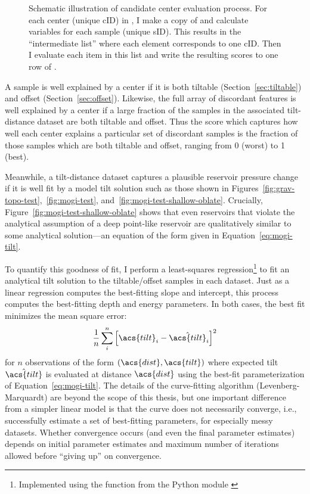 \begin{figure}
    \caption[Center evaluation process]{Schematic illustration of candidate center evaluation process. For each center (unique cID) in , I make a copy of  and calculate variables for each sample (unique sID). This results in the ``intermediate list'' where each element corresponds to one cID. Then I evaluate each item in this list and write the resulting scores to one row of .}%
    \label{fig:eval-model}
\end{figure}

A sample is well explained by a center if it is both tiltable (Section~\ref{sec:tiltable}) and offset (Section~\ref{sec:offset}). Likewise, the full array of discordant features is well explained by a center if a large fraction of the samples in the associated tilt-distance dataset are both tiltable and offset. Thus the score which captures how well each center explains a particular set of discordant samples is the fraction of those samples which are both tiltable and offset, ranging from 0 (worst) to 1 (best).

Meanwhile, a tilt-distance dataset captures a plausible reservoir pressure change if it is well fit by a model tilt solution such as those shown in Figures~\ref{fig:grav-topo-test},~\ref{fig:mogi-test}, and~\ref{fig:mogi-test-shallow-oblate}. Crucially, Figure~\ref{fig:mogi-test-shallow-oblate} shows that even reservoirs that violate the analytical assumption of a deep point-like reservoir are qualitatively similar to some analytical solution---an equation of the form given in Equation~\eqref{eq:mogi-tilt}.

To quantify this goodness of fit, I perform a least-squares regression\footnote{Implemented using the  function from the  Python module \parencite{2020SciPy-NMeth}} to fit an analytical tilt solution to the tiltable/offset samples in each dataset. Just as a linear regression computes the best-fitting slope and intercept, this process computes the best-fitting depth and energy parameters. In both cases, the best fit minimizes the mean square error:
\begin{equation}
    \frac{1}{n}\sum_{i}^{n}{\left[\acs{tilt}_i-\hat{\acs{tilt}}_i\right]}^2\label{eq:mse}
\end{equation}
for $n$ observations of the form $(\acs{dist}, \acs{tilt})$ where expected tilt $\hat{\acs{tilt}}$ is evaluated at distance $\acs{dist}$ using the best-fit parameterization of Equation~\eqref{eq:mogi-tilt}. The details of the curve-fitting algorithm (Levenberg-Marquardt) are beyond the scope of this thesis, but one important difference from a simpler linear model is that the curve does not necessarily converge, i.e., successfully estimate a set of best-fitting parameters, for especially messy datasets. Whether convergence occurs (and even the final parameter estimates) depends on initial parameter estimates and maximum number of iterations allowed before ``giving up'' on convergence.


